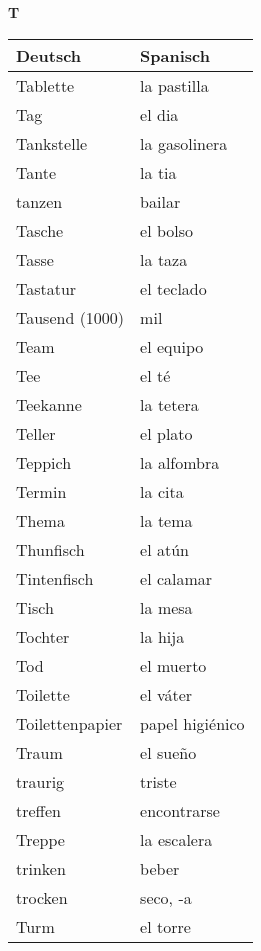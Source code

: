 \begin{flushright}\begin{Huge}\textbf{T}\end{Huge}\end{flushright}

\begin{longtable}{p{} p{}} 
\textbf{Deutsch}     & \textbf{Spanisch}                                       \\ \hline
\hline
\endhead %
Tablette & la pastilla\\
Tag & el dia \\
Tankstelle & la gasolinera\\
Tante & la tia\\
tanzen & bailar\\
Tasche & el bolso\\
Tasse & la taza\\
Tastatur & el teclado\\
Tausend (1000) & mil\\
Team & el equipo\\
Tee & el té\\
Teekanne & la tetera\\
Teller & el plato\\
Teppich & la alfombra\\
Termin & la cita\\
Thema & la tema\\
Thunfisch & el atún\\
Tintenfisch & el calamar\\
Tisch & la mesa\\
Tochter & la hija\\
Tod & el muerto\\
Toilette & el váter\\
Toilettenpapier & papel higiénico\\
Traum & el sueño\\
traurig & triste \\
treffen & encontrarse\\
Treppe & la escalera\\
trinken & beber\\
trocken & seco, -a\\
Turm & el torre\\

\end{longtable}
